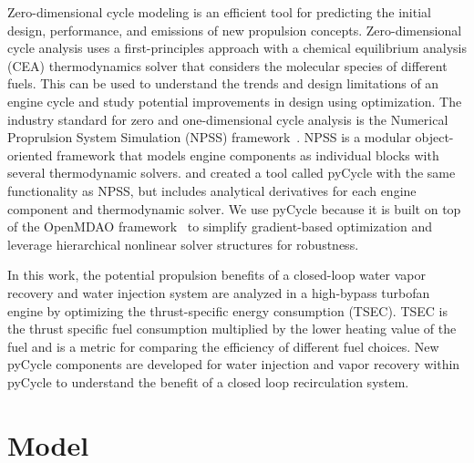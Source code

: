 \documentclass[12pt]{new-aiaa}
\begin{document}
Zero-dimensional cycle modeling is an efficient tool for predicting the initial design, performance, and emissions of new propulsion concepts.
Zero-dimensional cycle analysis uses a first-principles approach with a chemical equilibrium analysis (CEA) thermodynamics solver that considers the molecular species of different fuels.
This can be used to understand the trends and design limitations of an engine cycle and study potential improvements in design using optimization.
The industry standard for zero and one-dimensional cycle analysis is the Numerical Proprulsion System Simulation (NPSS) framework~\cite{JonesNPSS}.
NPSS is a modular object-oriented framework that models engine components as individual blocks with several thermodynamic solvers.
\citet{Hendricks2019} and \citet{Gray2017b} created a tool called pyCycle with the same functionality as NPSS, but includes analytical derivatives for each engine component and thermodynamic solver.
We use pyCycle because it is built on top of the OpenMDAO framework~\cite{Gray2019a} to simplify gradient-based optimization and leverage hierarchical nonlinear solver structures for robustness.

In this work, the potential propulsion benefits of a closed-loop water vapor recovery and water injection system are analyzed in a high-bypass turbofan engine by optimizing the thrust-specific energy consumption (TSEC).
TSEC is the thrust specific fuel consumption multiplied by the lower heating value of the fuel and is a metric for comparing the efficiency of different fuel choices.
New pyCycle components are developed for water injection and vapor recovery within pyCycle to understand the benefit of a closed loop recirculation system.

\section{Model}
\end{document}
